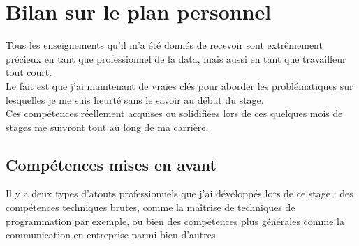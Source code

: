 \documentclass{rapportCS}
\begin{document}
\newpage
\section{Bilan sur le plan personnel}
Tous les enseignements qu'il m'a été donnés de recevoir sont extrêmement précieux en tant que
professionnel de la data, mais aussi en tant que travailleur tout court.\\
Le fait est que j'ai maintenant de vraies clés pour aborder les problématiques sur 
lesquelles je me suis heurté sans le savoir au début du stage.\\
Ces compétences réellement acquises ou solidifiées lors de ces quelques mois de stages
me suivront tout au long de ma carrière.

\subsection{Compétences mises en avant}
Il y a deux types d'atouts professionnels que j'ai développés lors de ce stage : des 
compétences techniques brutes, comme la maîtrise de techniques de
programmation par exemple, ou bien des compétences plus générales comme la 
communication en entreprise parmi bien d'autres.
\end{document}
